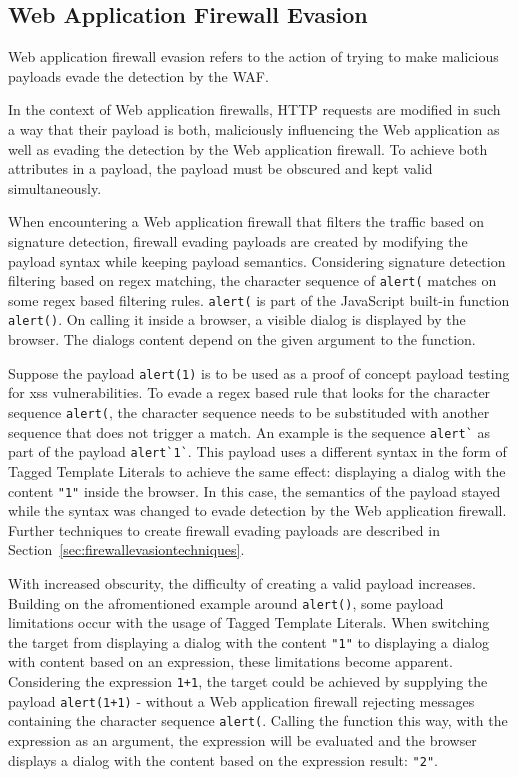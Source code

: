 \subsection{Web Application Firewall Evasion}
Web application firewall evasion refers to the action of trying to make malicious payloads evade the detection by the WAF.

In the context of Web application firewalls, HTTP requests are modified in such a way that their payload is both, maliciously influencing the Web application as well as evading the detection by the Web application firewall. To achieve both attributes in a payload, the payload must be obscured and kept valid simultaneously. 

When encountering a Web application firewall that filters the traffic based on signature detection, firewall evading payloads are created by modifying the payload syntax while keeping payload semantics. Considering signature detection filtering based on regex matching, the character sequence of \verb|alert(| matches on some regex based filtering rules. \verb|alert(| is part of the JavaScript built-in function \verb|alert()|. On calling it inside a browser, a visible dialog is displayed by the browser. The dialogs content depend on the given argument to the function. 

Suppose the payload \verb|alert(1)| is to be used as a proof of concept payload testing for \gls{xss} vulnerabilities.
To evade a regex based rule that looks for the character sequence \verb|alert(|, the character sequence needs to be substituded with another sequence that does not trigger a match. An example is the sequence \verb|alert`| as part of the payload \verb|alert`1`|. This payload uses a different syntax in the form of Tagged Template Literals to achieve the same effect: displaying a dialog with the content \verb|"1"| inside the browser.
In this case, the semantics of the payload stayed while the syntax was changed to evade detection by the Web application firewall.
Further techniques to create firewall evading payloads are described in Section~\ref{sec:firewallevasiontechniques}.

With increased obscurity, the difficulty of creating a valid payload increases. Building on the afromentioned example around \verb|alert()|, some payload limitations occur with the usage of Tagged Template Literals. When switching the target from displaying a dialog with the content \verb|"1"| to displaying a dialog with content based on an expression, these limitations become apparent. Considering the expression \verb|1+1|, the target could be achieved by supplying the payload \verb|alert(1+1)| - without a Web application firewall rejecting messages containing the character sequence \verb|alert(|. Calling the function this way, with the expression as an argument, the expression will be evaluated and the browser displays a dialog with the content based on the expression result: \verb|"2"|.

